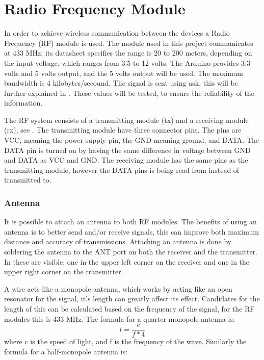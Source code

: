 \section{Radio Frequency Module} \label{rfmodule}
In order to achieve wireless communication between the devices a Radio Frequency (RF) module is used.
The module used in this project communicates at 433 MHz; its datasheet specifies the range is 20 to 200 meters, depending on the input voltage, which ranges from 3.5 to 12 volts. 
The Arduino provides 3.3 volts and 5 volts output, and the 5 volts output will be used.
The maximum bandwidth is 4 kilobytes/secound. 
The signal is sent using \gls{ask}, this will be further explained in .
These values will be tested, to ensure the reliability of the information. 

The RF system consists of a transmitting module (tx) and a receiving module (rx), see .
The transmitting module have three connector pins.
The pins are VCC, meaning the power supply pin, the GND meaning ground, and DATA.
The DATA pin is turned on by having the same difference in voltage between GND and DATA as VCC and GND. 
The receiving module has the same pins as the transmitting module, however the DATA pins is being read from instead of transmitted to.


\subsubsection{Antenna}
It is possible to attach an antenna to both RF modules. 
The benefits of using an antenna is to better send and/or receive signals, this can improve both maximum distance and accuracy of transmissions.
Attaching an antenna is done by soldering the antenna to the ANT port on both the receiver and the transmitter. 
In  these are visible; one in the upper left corner on the receiver and one in the upper right corner on the transmitter. 

A wire acts like a monopole antenna, which works by acting like an open resonator for the signal, it's length can greatly affect its effect. 
Candidates for the length of this can be calculated based on the frequency of the signal, for the RF modules this is 433 MHz.
The formula for a quarter-monopole antenna is: 
\begin{equation} \label{QMA}
l = \frac{c}{f * 4}
\end{equation}
where c is the speed of light, and f is the frequency of the wave.
Similarly the formula for a half-monopole antenna is: 


